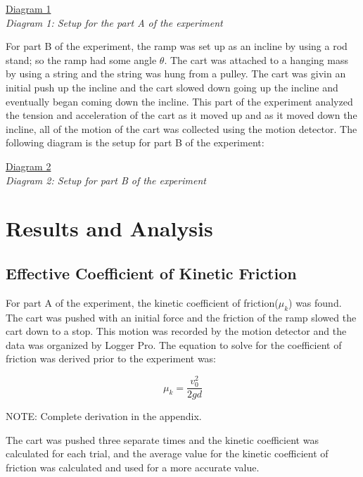 \documentclass[aps,letterpaper,11pt]{revtex4}
\begin{document}
\begin{center}
\underline{Diagram 1}\\

\textit{Diagram 1: Setup for the part A of the experiment}\\
\end{center}

For part B of the experiment, the ramp was set up as an incline by using a rod stand; so the ramp had some angle $\theta$. The cart was attached to a hanging mass by using a string and the string was hung from a pulley. The cart was givin an initial push up the incline and the cart slowed down going up the incline and eventually began coming down the incline. This part of the experiment analyzed the tension and acceleration of the cart as it moved up and as it moved down the incline, all of the motion of the cart was collected using the motion detector. The following diagram is the setup for part B of the experiment:

\newpage

\begin{center}
\underline{Diagram 2}\\

\textit{Diagram 2: Setup for part B of the experiment}\\
\end{center}

\section{Results and Analysis}

\subsection{Effective Coefficient of Kinetic Friction}

For part A of the experiment, the kinetic coefficient of friction($\mu_k$) was found. The cart was pushed with an initial force and the friction of the ramp slowed the cart down to a stop. This motion was recorded by the motion detector and the data was organized by Logger Pro. The equation to solve for the coefficient of friction was derived prior to the experiment was:

$$ \mu_k = \frac{v_0^2}{2gd}$$
\begin{center}
NOTE: Complete derivation in the appendix.
\end{center}

The cart was pushed three separate times and the kinetic coefficient was calculated for each trial, and the average value for the kinetic coefficient of friction was calculated and used for a more accurate value. 
\end{document}
